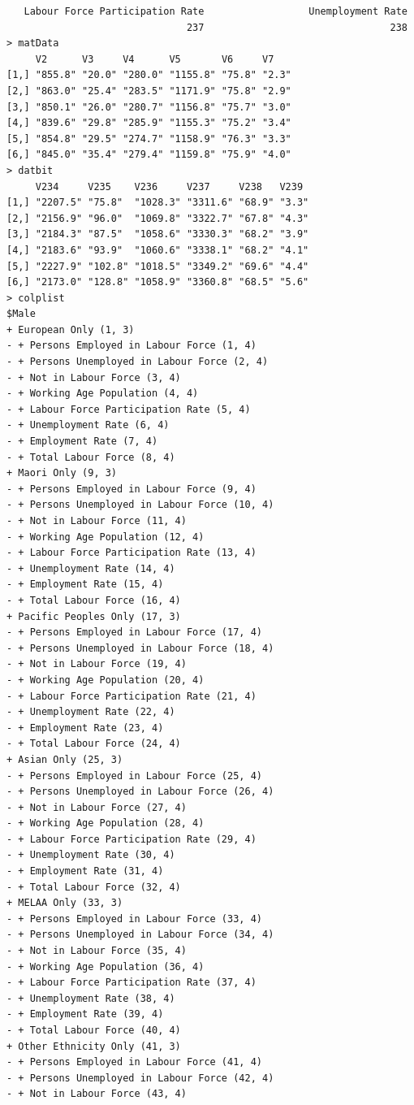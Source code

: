 \documentclass[a4paper]{article}
\begin{document}
\begin{verbatim}
   Labour Force Participation Rate                  Unemployment Rate 
                               237                                238 
> matData 
     V2      V3     V4      V5       V6     V7   
[1,] "855.8" "20.0" "280.0" "1155.8" "75.8" "2.3"
[2,] "863.0" "25.4" "283.5" "1171.9" "75.8" "2.9"
[3,] "850.1" "26.0" "280.7" "1156.8" "75.7" "3.0"
[4,] "839.6" "29.8" "285.9" "1155.3" "75.2" "3.4"
[5,] "854.8" "29.5" "274.7" "1158.9" "76.3" "3.3"
[6,] "845.0" "35.4" "279.4" "1159.8" "75.9" "4.0"
> datbit 
     V234     V235    V236     V237     V238   V239 
[1,] "2207.5" "75.8"  "1028.3" "3311.6" "68.9" "3.3"
[2,] "2156.9" "96.0"  "1069.8" "3322.7" "67.8" "4.3"
[3,] "2184.3" "87.5"  "1058.6" "3330.3" "68.2" "3.9"
[4,] "2183.6" "93.9"  "1060.6" "3338.1" "68.2" "4.1"
[5,] "2227.9" "102.8" "1018.5" "3349.2" "69.6" "4.4"
[6,] "2173.0" "128.8" "1058.9" "3360.8" "68.5" "5.6"
> colplist 
$Male
+ European Only (1, 3)
- + Persons Employed in Labour Force (1, 4)
- + Persons Unemployed in Labour Force (2, 4)
- + Not in Labour Force (3, 4)
- + Working Age Population (4, 4)
- + Labour Force Participation Rate (5, 4)
- + Unemployment Rate (6, 4)
- + Employment Rate (7, 4)
- + Total Labour Force (8, 4)
+ Maori Only (9, 3)
- + Persons Employed in Labour Force (9, 4)
- + Persons Unemployed in Labour Force (10, 4)
- + Not in Labour Force (11, 4)
- + Working Age Population (12, 4)
- + Labour Force Participation Rate (13, 4)
- + Unemployment Rate (14, 4)
- + Employment Rate (15, 4)
- + Total Labour Force (16, 4)
+ Pacific Peoples Only (17, 3)
- + Persons Employed in Labour Force (17, 4)
- + Persons Unemployed in Labour Force (18, 4)
- + Not in Labour Force (19, 4)
- + Working Age Population (20, 4)
- + Labour Force Participation Rate (21, 4)
- + Unemployment Rate (22, 4)
- + Employment Rate (23, 4)
- + Total Labour Force (24, 4)
+ Asian Only (25, 3)
- + Persons Employed in Labour Force (25, 4)
- + Persons Unemployed in Labour Force (26, 4)
- + Not in Labour Force (27, 4)
- + Working Age Population (28, 4)
- + Labour Force Participation Rate (29, 4)
- + Unemployment Rate (30, 4)
- + Employment Rate (31, 4)
- + Total Labour Force (32, 4)
+ MELAA Only (33, 3)
- + Persons Employed in Labour Force (33, 4)
- + Persons Unemployed in Labour Force (34, 4)
- + Not in Labour Force (35, 4)
- + Working Age Population (36, 4)
- + Labour Force Participation Rate (37, 4)
- + Unemployment Rate (38, 4)
- + Employment Rate (39, 4)
- + Total Labour Force (40, 4)
+ Other Ethnicity Only (41, 3)
- + Persons Employed in Labour Force (41, 4)
- + Persons Unemployed in Labour Force (42, 4)
- + Not in Labour Force (43, 4)

\end{verbatim}
\end{document}
